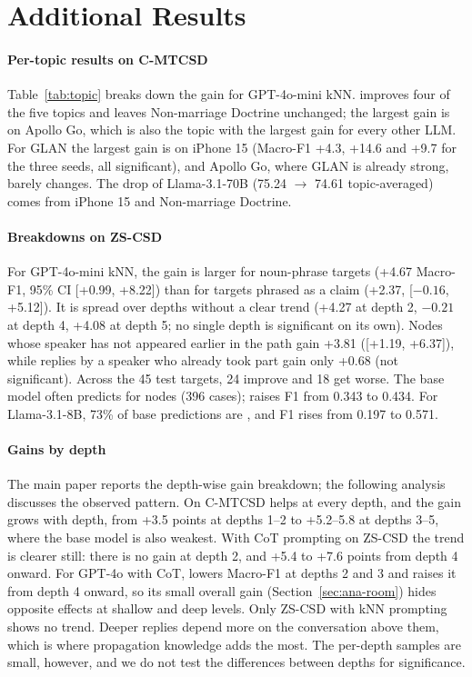 \section{Additional Results}
\label{app:results}

\paragraph{Per-topic results on C-MTCSD}
Table~\ref{tab:topic} breaks down the gain for GPT-4o-mini kNN. \spin{} improves four of the five topics and leaves Non-marriage Doctrine unchanged; the largest gain is on Apollo Go, which is also the topic with the largest gain for every other LLM. For GLAN the largest gain is on iPhone 15 (Macro-F1 +4.3, +14.6 and +9.7 for the three seeds, all significant), and Apollo Go, where GLAN is already strong, barely changes. The \favg{} drop of Llama-3.1-70B (75.24 $\rightarrow$ 74.61 topic-averaged) comes from iPhone 15 and Non-marriage Doctrine.

\paragraph{Breakdowns on ZS-CSD}
For GPT-4o-mini kNN, the gain is larger for noun-phrase targets (+4.67 Macro-F1, 95\% CI [+0.99, +8.22]) than for targets phrased as a claim (+2.37, [$-0.16$, +5.12]). It is spread over depths without a clear trend (+4.27 at depth 2, $-0.21$ at depth 4, +4.08 at depth 5; no single depth is significant on its own). Nodes whose speaker has not appeared earlier in the path gain +3.81 ([+1.19, +6.37]), while replies by a speaker who already took part gain only +0.68 (not significant). Across the 45 test targets, 24 improve and 18 get worse. The base model often predicts \against{} for \favor{} nodes (396 cases); \spin{} raises \favor{} F1 from 0.343 to 0.434. For Llama-3.1-8B, 73\% of base predictions are \against{}, and \nonelabel{} F1 rises from 0.197 to 0.571.

\paragraph{Gains by depth}
The main paper reports the depth-wise gain breakdown; the following analysis discusses the observed pattern. On C-MTCSD \spin{} helps at every depth, and the gain grows with depth, from +3.5 points at depths 1--2 to +5.2--5.8 at depths 3--5, where the base model is also weakest. With CoT prompting on ZS-CSD the trend is clearer still: there is no gain at depth 2, and +5.4 to +7.6 points from depth 4 onward. For GPT-4o with CoT, \spin{} lowers Macro-F1 at depths 2 and 3 and raises it from depth 4 onward, so its small overall gain (Section~\ref{sec:ana-room}) hides opposite effects at shallow and deep levels. Only ZS-CSD with kNN prompting shows no trend. Deeper replies depend more on the conversation above them, which is where propagation knowledge adds the most. The per-depth samples are small, however, and we do not test the differences between depths for significance.

